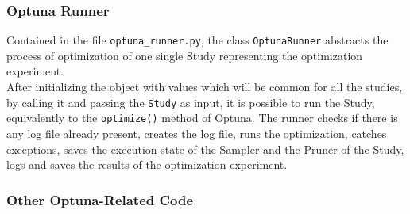 \subsubsection{Optuna Runner}

Contained in the file \texttt{optuna\_runner.py}, the class \texttt{OptunaRunner} abstracts the process of optimization of one single Study representing the optimization experiment.
% 
\\[0.3cm]After initializing the object with values which will be common for all the studies, by calling it and passing the \texttt{Study} as input, it is possible to run the Study, equivalently to the \texttt{optimize()} method of Optuna.
The runner checks if there is any log file already present, creates the log file, runs the optimization, catches exceptions, saves the execution state of the Sampler and the Pruner of the Study, logs and saves the results of the optimization experiment.

\subsubsection{Other Optuna-Related Code}

